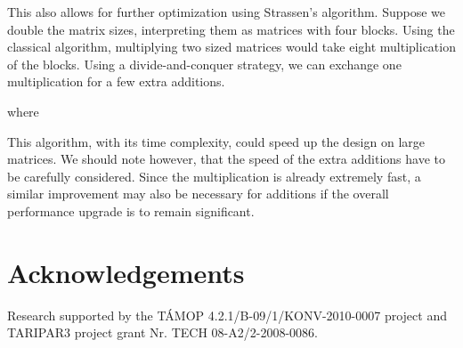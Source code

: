 \documentclass[11pt,twoside]{article}
\begin{document}
This also allows for further optimization using Strassen's algorithm. Suppose we double the matrix sizes, interpreting them as matrices with four blocks. Using the classical algorithm, multiplying two  sized matrices would take eight multiplication of the blocks. Using a divide-and-conquer strategy, we can exchange one multiplication for a few extra additions.

where

This algorithm, with its  time complexity, could speed up the design on large matrices. We should note however, that the speed of the extra additions have to be carefully considered. Since the multiplication is already extremely fast, a similar improvement may also be necessary for additions if the overall performance upgrade is to remain significant.


\section*{Acknowledgements}
Research supported by the T\'AMOP 4.2.1/B-09/1/KONV-2010-0007 project and TARIPAR3 project grant Nr. TECH 08-A2/2-2008-0086.
\end{document}
